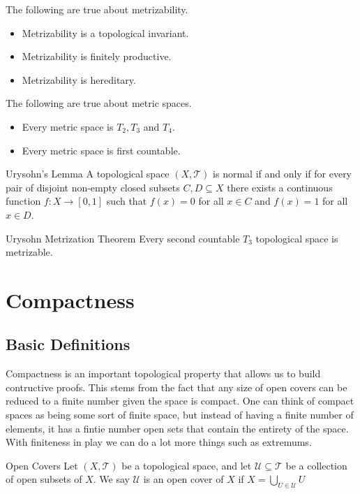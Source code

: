 \begin{prp}{}{} The following are true about metrizability. 
\begin{itemize}
\item Metrizability is a topological invariant. 
\item Metrizability is finitely productive. 
\item Metrizability is hereditary. 
\end{itemize}
\end{prp}

\begin{prp}{}{} The following are true about metric spaces. 
\begin{itemize}
\item Every metric space is $T_2,T_3$ and $T_4$. 
\item Every metric space is first countable. 
\end{itemize}
\end{prp}

\begin{thm}{Urysohn's Lemma}{} A topological space $(X,\mathcal{T})$ is normal if and only if for every pair of disjoint non-empty closed subsets $C,D\subseteq X$ there exists a continuous function $f:X\to[0,1]$ such that $f(x)=0$ for all $x\in C$ and $f(x)=1$ for all $x\in D$. 
\end{thm}

\begin{thm}{Urysohn Metrization Theorem}{} Every second countable $T_3$ topological space is metrizable. 
\end{thm}

\pagebreak
\section{Compactness}
\subsection{Basic Definitions}
Compactness is an important topological property that allows us to build contructive proofs. This stems from the fact that any size of open covers can be reduced to a finite number given the space is compact. One can think of compact spaces as being some sort of finite space, but instead of having a finite number of elements, it has a fintie number open sets that contain the entirety of the space. With finiteness in play we can do a lot more things such as extremums. 

\begin{defn}{Open Covers}{} Let $(X,\mathcal{T})$ be a topological space, and let $\mathcal{U}\subseteq\mathcal{T}$ be a collection of open subsets of $X$. We say $\mathcal{U}$ is an open cover of $X$ if $X=\bigcup_{U\in\mathcal{U}}U$
\end{defn}

